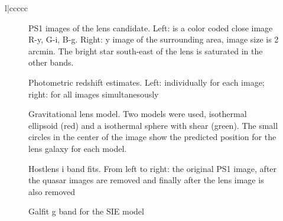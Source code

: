 \documentclass[manuscript]{aastex}
\begin{document}
\begin{deluxetable}{l|ccccc}
\enddata


\end{deluxetable}


\begin{figure}
\caption{
PS1 images of the lens candidate. Left: is a color coded close image R-y, G-i, B-g. Right: y image of the surrounding area, image size is 2 arcmin. The bright star south-east of the lens is saturated in the other bands.
}
\label{lens}
\end{figure}



\begin{figure}
\caption{
Photometric redshift estimates. 
Left: individually for each image; right: for all images simultanesously}
\label{redshift}
\end{figure}


\begin{figure}
\caption{
Gravitational lens model. Two models were used, isothermal ellipsoid (red) and a isothermal sphere with shear (green). The small circles in the center of the image show the predicted position for the lens galaxy for each model.}
\label{model}
\end{figure}

\begin{figure}
\caption{
Hostlens i band fits. From left to right: the original PS1 image, after the quasar images are removed and finally after the lens image is also removed}
\label{hostlensi}
\end{figure}


\begin{figure}
\caption{
Galfit g band for the SIE model}
\label{galfitgSIE}
\end{figure}
\end{document}

